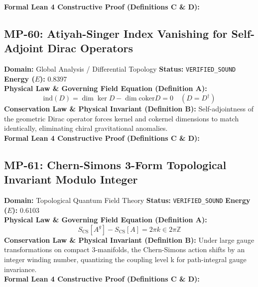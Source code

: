 \textbf{Formal Lean 4 Constructive Proof (Definitions C \& D):}


\vspace{1em}
\subsection{MP-60: Atiyah-Singer Index Vanishing for Self-Adjoint Dirac Operators}
\textbf{Domain:} Global Analysis / Differential Topology \hfill \textbf{Status:} \texttt{VERIFIED\_SOUND} \hfill \textbf{Energy ($E$):} 0.8397\\
\textbf{Physical Law \& Governing Field Equation (Definition A):}
\begin{equation*}
\text{ind}(D) = \dim \ker D - \dim \text{coker} D = 0 \quad (D = D^\dagger)
\end{equation*}
\textbf{Conservation Law \& Physical Invariant (Definition B):}
Self-adjointness of the geometric Dirac operator forces kernel and cokernel dimensions to match identically, eliminating chiral gravitational anomalies.\\

\textbf{Formal Lean 4 Constructive Proof (Definitions C \& D):}


\vspace{1em}
\subsection{MP-61: Chern-Simons 3-Form Topological Invariant Modulo Integer}
\textbf{Domain:} Topological Quantum Field Theory \hfill \textbf{Status:} \texttt{VERIFIED\_SOUND} \hfill \textbf{Energy ($E$):} 0.6103\\
\textbf{Physical Law \& Governing Field Equation (Definition A):}
\begin{equation*}
S_{\text{CS}}[A^g] - S_{\text{CS}}[A] = 2\pi k \in 2\pi \mathbb{Z}
\end{equation*}
\textbf{Conservation Law \& Physical Invariant (Definition B):}
Under large gauge transformations on compact 3-manifolds, the Chern-Simons action shifts by an integer winding number, quantizing the coupling level k for path-integral gauge invariance.\\

\textbf{Formal Lean 4 Constructive Proof (Definitions C \& D):}


\vspace{1em}
